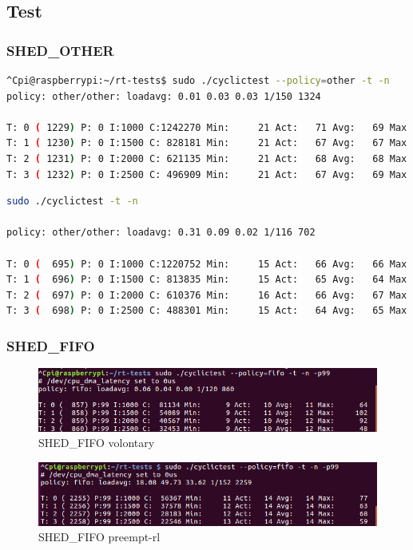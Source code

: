 \documentclass[10pt,a4paper]{article}
\begin{document}
\subsection{Test}
\subsubsection{SHED\_OTHER}

\begin{lstlisting}[language=bash,caption={preempt-rt kernel}]
^Cpi@raspberrypi:~/rt-tests$ sudo ./cyclictest --policy=other -t -n
policy: other/other: loadavg: 0.01 0.03 0.03 1/150 1324          

T: 0 ( 1229) P: 0 I:1000 C:1242270 Min:     21 Act:   71 Avg:   69 Max:    2541
T: 1 ( 1230) P: 0 I:1500 C: 828181 Min:     21 Act:   67 Avg:   67 Max:    1991
T: 2 ( 1231) P: 0 I:2000 C: 621135 Min:     21 Act:   68 Avg:   68 Max:    4476
T: 3 ( 1232) P: 0 I:2500 C: 496909 Min:     21 Act:   67 Avg:   69 Max:    3180
\end{lstlisting}
\begin{lstlisting}[language=bash,caption={volontary kernel}]
sudo ./cyclictest -t -n

policy: other/other: loadavg: 0.31 0.09 0.02 1/116 702          

T: 0 (  695) P: 0 I:1000 C:1220752 Min:     15 Act:   66 Avg:   66 Max:     528
T: 1 (  696) P: 0 I:1500 C: 813835 Min:     15 Act:   65 Avg:   64 Max:     490
T: 2 (  697) P: 0 I:2000 C: 610376 Min:     16 Act:   66 Avg:   67 Max:    1354
T: 3 (  698) P: 0 I:2500 C: 488301 Min:     15 Act:   64 Avg:   65 Max:     545

\end{lstlisting}

\subsubsection{SHED\_FIFO}
\begin{figure}[H]
\includegraphics[width=16cm]{Voluntary-Fifo-WithoutHackbench.png}
\caption{SHED\_FIFO volontary}
\end{figure}
\begin{figure}[H]
\includegraphics[width=16cm]{Preempt-Fifo-WithoutHackbench.png}
\caption{SHED\_FIFO preempt-rl}
\end{figure}
\end{document}
